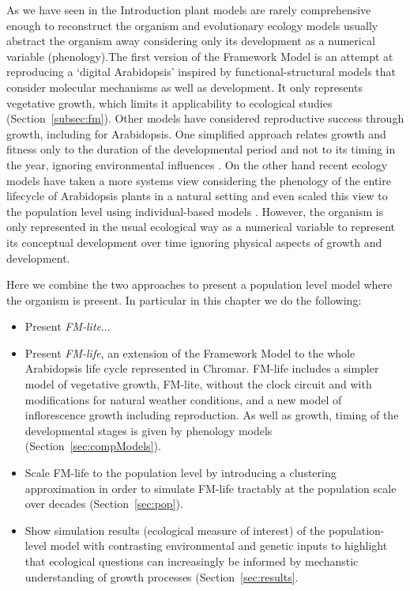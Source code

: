 As we have seen in the Introduction plant models are rarely comprehensive enough
to reconstruct the organism and evolutionary ecology models usually abstract the
organism away considering only its development as a numerical variable
(phenology).The first version of the Framework Model
\citep[FMv1;][]{chew_multiscale_2014} is an attempt at reproducing a `digital
Arabidopsis' inspired by functional-structural models that consider molecular
mechanisms as well as development. It only represents vegetative growth, which
limits it applicability to ecological studies (Section~\ref{subsec:fm}). Other
models have considered reproductive success through growth, including for
Arabidopsis. One simplified approach relates growth and fitness only to the
duration of the developmental period and not to its timing in the year, ignoring
environmental influences \citep{prusinkiewicz_evolution_2007}. On the other hand
recent ecology models have taken a more systems view considering the phenology
of the entire lifecycle of Arabidopsis plants in a natural setting and even
scaled this view to the population level using individual-based models
\citep{burghardt_modeling_2015}. However, the organism is only represented in
the usual ecological way as a numerical variable to represent its conceptual
development over time ignoring physical aspects of growth and development.

Here we combine the two approaches to present a population level model where the
organism is present. In particular in this chapter we do the following:
\begin{itemize}
\item Present \emph{FM-lite}...
\item Present \emph{FM-life}, an extension of the Framework Model to the whole
  Arabidopsis life cycle represented in Chromar. FM-life includes a simpler
  model of vegetative growth, FM-lite, without the clock circuit and with
  modifications for natural weather conditions, and a new model of inflorescence
  growth including reproduction. As well as growth, timing of the developmental
  stages is given by phenology models (Section~\ref{sec:compModels}).
\item Scale FM-life to the population level by introducing a clustering
  approximation in order to simulate FM-life tractably at the population scale
  over decades (Section~\ref{sec:pop}).
\item Show simulation results (ecological measure of interest) of the
  population-level model with contrasting environmental and genetic inputs to
  highlight that ecological questions can increasingly be informed by mechanstic
  understanding of growth processes \citep{millar_intracellular_2016,
    doebeli_towards_2017} (Section~\ref{sec:results}.
\end{itemize}


